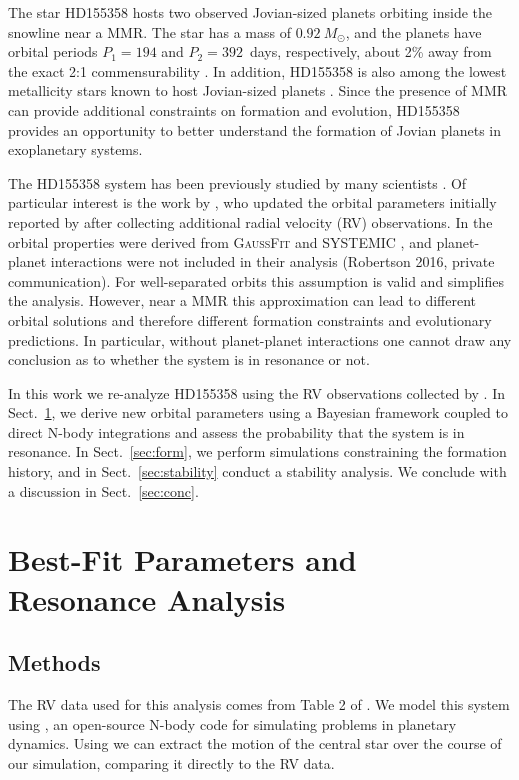 The star HD155358 hosts two observed Jovian-sized planets orbiting inside the snowline near a MMR. 
The star has a mass of $0.92~M_{\odot}$, and the planets have orbital periods $P_1 = 194$ and $P_2 = 392$~days, respectively, about 2\% away from the exact 2:1 commensurability \citep[][hereafter \R]{Robertson2012}. 
In addition, HD155358 is also among the lowest metallicity stars known to host Jovian-sized planets \citep{Cochran2007}.
Since the presence of MMR can provide additional constraints on formation and evolution, HD155358 provides an opportunity to better understand the formation of Jovian planets in exoplanetary systems.

The HD155358 system has been previously studied by many scientists \citep{Cochran2007,Fuhrmann2008,Robertson2012,Andre2016}.
Of particular interest is the work by \R, who updated the orbital parameters initially reported by \citet{Cochran2007} after collecting additional radial velocity (RV) observations.
In \R the orbital properties were derived from \textsc{GaussFit\-} \citep{Jefferys1988} and \textsc{SYSTEMIC} \citep{Meschiari2009}, and planet-planet interactions were not included in their analysis (Robertson 2016, private communication). 
For well-separated orbits this assumption is valid and simplifies the analysis.
However, near a MMR this approximation can lead to different orbital solutions and therefore different formation constraints and evolutionary predictions. 
In particular, without planet-planet interactions one cannot draw any conclusion as to whether the system is in resonance or not. 

In this work we re-analyze HD155358 using the RV observations collected by \R.
In Sect.~\ref{sec:orb}, we derive new orbital parameters using a Bayesian framework coupled to direct N-body integrations and assess the probability that the system is in resonance.
In Sect.~\ref{sec:form}, we perform simulations constraining the formation history, and in Sect.~\ref{sec:stability} conduct a stability analysis. 
We conclude with a discussion in Sect.~\ref{sec:conc}.

\section{Best-Fit Parameters and Resonance Analysis}
\label{sec:orb}
\subsection{Methods}
\label{sec:Fit}
The RV data used for this analysis comes from Table 2 of \R. 
We model this system using \reb \citep{Rein2012}, an open-source N-body code for simulating problems in planetary dynamics.
Using \reb we can extract the motion of the central star over the course of our simulation, comparing it directly to the RV data. 

